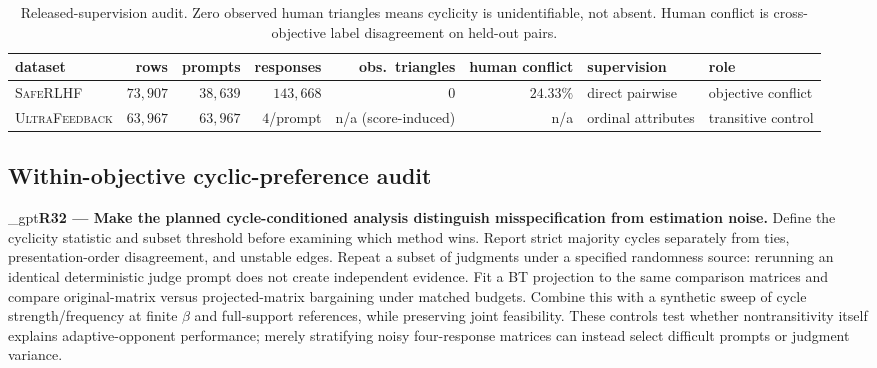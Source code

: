 \documentclass{article}
\makeatletter
\newif\ifshowreviews
\let\revieworiginalref\ref
\newcommand{\reviewref}[1]{%
  \@ifundefined{r@#1}{\textnormal{[original-draft ref.: \texttt{\detokenize{#1}}]}}%
  {\revieworiginalref{#1}}}
\let\ref\reviewref
\newcommand{\reviewresponse}[1]{%
  \ifshowreviews
  \par\begingroup\color{blue!65!black}\hypersetup{allcolors=blue!65!black}\emergencystretch=2em%
  \noindent\textbf{Response:} #1\par\endgroup
  \fi}
\theoremstyle{remark}
\theoremstyle{plain}
\makeatother
\begin{document}
\begin{table}[t]
\centering\scriptsize
\setlength{\tabcolsep}{2.4pt}
\caption{Released-supervision audit. Zero observed human triangles means cyclicity is unidentifiable, not absent. Human conflict is cross-objective label disagreement on held-out pairs.}
\label{tab:data-audit}
\begin{tabular}{lrrrrrll}
\toprule
dataset & rows & prompts & responses & obs.\ triangles & human conflict & supervision & role\\
\midrule
\textsc{SafeRLHF} & $73{,}907$ & $38{,}639$ & $143{,}668$ & $0$ & $24.33\%$ & direct pairwise & objective conflict\\
\textsc{UltraFeedback} & $63{,}967$ & $63{,}967$ & $4$/prompt & n/a (score-induced) & n/a & ordinal attributes & transitive control\\
\bottomrule
\end{tabular}
\end{table}

\subsection{Within-objective cyclic-preference audit}
\label{app:within-rubric-audit}

\kekim_gpt{\textbf{R32 --- Make the planned cycle-conditioned analysis distinguish misspecification from estimation noise.} Define the cyclicity statistic and subset threshold before examining which method wins. Report strict majority cycles separately from ties, presentation-order disagreement, and unstable edges. Repeat a subset of judgments under a specified randomness source: rerunning an identical deterministic judge prompt does not create independent evidence. Fit a BT projection to the same comparison matrices and compare original-matrix versus projected-matrix bargaining under matched budgets. Combine this with a synthetic sweep of cycle strength/frequency at finite $\beta$ and full-support references, while preserving joint feasibility. These controls test whether nontransitivity itself explains adaptive-opponent performance; merely stratifying noisy four-response matrices can instead select difficult prompts or judgment variance.}
\reviewresponse{\textbf{R32 --- Partially addressed.} The $60{,}000$-judgment audit reports repeated cycles, order sensitivity, fitted BT-noise comparisons and held-out prediction. No corrected repeated-cycle excess is resolved and no order-robust witness is eligible; this does not prove transitivity. Original-versus-BT-projected bargaining remains pending. Appendix~\ref{app:dataset_stress_test} specifies a separate cycle/conflict audit and controlled factorial test before new policy conclusions.}
\end{document}
